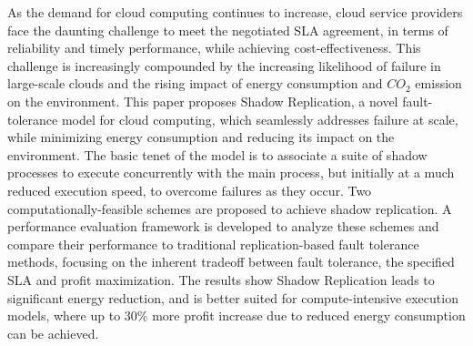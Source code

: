 As the demand for cloud computing continues to increase, cloud service
providers face the daunting challenge to meet the negotiated SLA
agreement, in terms of reliability and timely performance, while
achieving cost-effectiveness. This challenge is increasingly
compounded by the increasing likelihood of failure in large-scale
clouds and the rising impact of energy consumption and $CO_2$ emission on the environment. This paper proposes
Shadow Replication, a novel fault-tolerance model for cloud computing,
which seamlessly addresses failure at scale, while minimizing energy
consumption and reducing its impact on the environment. The basic tenet of the model is to associate a suite of
shadow processes to execute concurrently with the main process, but
initially at a much reduced execution speed, to overcome failures as
they occur. Two computationally-feasible schemes are proposed to
achieve shadow replication. A performance evaluation framework is
developed to analyze these schemes and compare their performance to
traditional replication-based fault tolerance methods, focusing on the
inherent tradeoff between fault tolerance, the specified SLA and
profit maximization. The results show Shadow Replication leads to
significant energy reduction, and is better suited for
compute-intensive execution models, where up to 30\% more profit
increase due to reduced energy consumption can be achieved.











